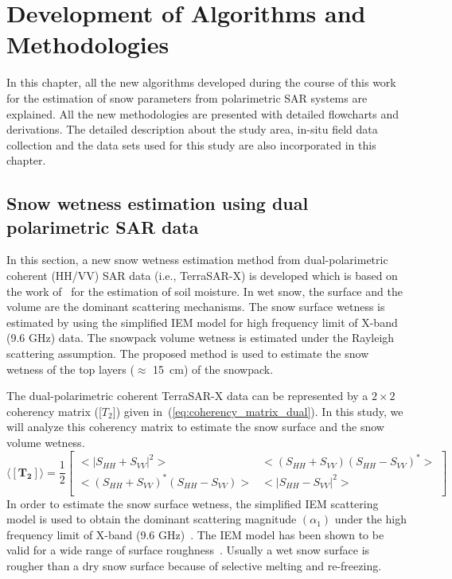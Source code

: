 \chapter{Development of Algorithms and Methodologies}
\label{sec:3}
In this chapter, all the new algorithms developed during the course of this work for the estimation of snow parameters from polarimetric SAR systems are explained. All the new methodologies are presented with detailed flowcharts and derivations. The detailed description about the study area, in-situ field data collection and the data sets used for this study are also incorporated in this chapter.

\section{Snow wetness estimation using dual polarimetric SAR data}
\label{sec:3.1}
In this section, a new snow wetness estimation method from dual-polarimetric coherent (HH/VV) SAR data
(i.e., TerraSAR-X) is developed which is based on the work of~\cite{jagdhuber2013polarimetric} for the estimation of soil moisture. In wet snow, the surface and the volume are the dominant scattering mechanisms. The snow surface wetness is estimated by using the simplified IEM model for high frequency limit of X-band (9.6 GHz) data. The snowpack volume wetness is estimated under the Rayleigh scattering assumption. The proposed method is used to estimate the snow wetness of the top layers ($\approx$ 15~cm) of the snowpack. 

The dual-polarimetric coherent TerraSAR-X data can be represented by a $2\times2$ coherency matrix ([$T_2$]) given in~(\ref{eq:coherency_matrix_dual}). In this study, we will analyze this coherency matrix to estimate the snow surface and the snow volume wetness. 
\begin{equation}
{
\mathbf{\langle[T_2]\rangle}= \frac{1}{2} \left[ \begin{array}{ccc}
<|S_{HH}+S_{VV}|^2> & <(S_{HH}+S_{VV})(S_{HH}-S_{VV})^*>\\
<(S_{HH}+S_{VV})^*(S_{HH}-S_{VV})> & <|S_{HH}-S_{VV}|^2>\\
\end{array}\right]	
 }
\label{eq:coherency_matrix_dual}
\end{equation}
In order to estimate the snow surface wetness, the simplified IEM scattering model is used to obtain the dominant scattering magnitude $(\alpha_1)$ under the high frequency limit of X-band (9.6 GHz)~\citep{allain2003}. The IEM model has been shown to be valid for a wide range of surface roughness~\citep{Fung92,fung1994microwave}. Usually a wet snow surface is rougher than a dry snow surface because of selective melting and re-freezing.  

